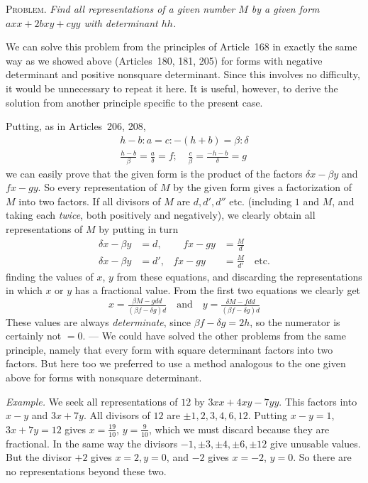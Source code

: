 \textsc{Problem.} \textit{Find all representations of a given number $M$ by a given form $axx+2bxy+cyy$ with determinant $hh$.}

We can solve this problem from the principles of Article~168 in exactly the same way as we showed above (Articles~180, 181, 205) for forms with negative determinant and positive nonsquare determinant. Since this involves no difficulty, it would be unnecessary to repeat it here. It is useful, however, to derive the solution from another principle specific to the present case.

Putting, as in Articles~206, 208,
\[
\begin{gathered}
h-b:a=c:-(h+b)=\beta:\delta\\
\frac{h-b}{\beta}=\frac a\delta=f;\quad
\frac c\beta=\frac{-h-b}{\delta}=g
\end{gathered}
\]
we can easily prove that the given form is the product of the factors $\delta x-\beta y$ and $fx-gy$. So every representation of $M$ by the given form gives a factorization of $M$ into two factors. If all divisors of $M$ are $d,d',d''$ etc. (including $1$ and $M$, and taking each \textit{twice}, both positively and negatively), we clearly obtain all representations of $M$ by putting in turn
\[
\begin{aligned}
\delta x-\beta y&=d,&\quad fx-gy&=\frac M d\\
\delta x-\beta y&=d',& fx-gy&=\frac M{d'}\quad\text{etc.}
\end{aligned}
\]
finding the values of $x$, $y$ from these equations, and discarding the representations in which $x$
or $y$ has a fractional value. From the first two equations we clearly get
\[
x=\tfrac{\beta M-gdd}{(\beta f-\delta g)d}\quad\text{and}\quad
y=\tfrac{\delta M-fdd}{(\beta f-\delta g)d}
\]
These values are always \textit{determinate}, since $\beta f-\delta g=2h$, so the numerator is certainly not $=0$. --- We could have solved the other problems from the same principle, namely that every form with square determinant factors into two factors. But here too we preferred to use a method analogous to the one given above for forms with nonsquare determinant.

\textit{Example.} We seek all representations of $12$ by $3xx+4xy-7yy$. This factors into $x-y$ and $3x+7y$. All divisors of $12$ are $\pm1,2,3,4,6,12$. Putting $x-y=1$, $3x+7y=12$ gives $x=\frac{19}{10}$, $y=\frac9{10}$, which we must discard because they are fractional. In the same way the divisors $-1,\pm3,\pm4,\pm6,\pm12$ give unusable values. But the divisor $+2$ gives $x=2,y=0$, and $-2$ gives $x=-2$, $y=0$. So there are no representations beyond these two.

